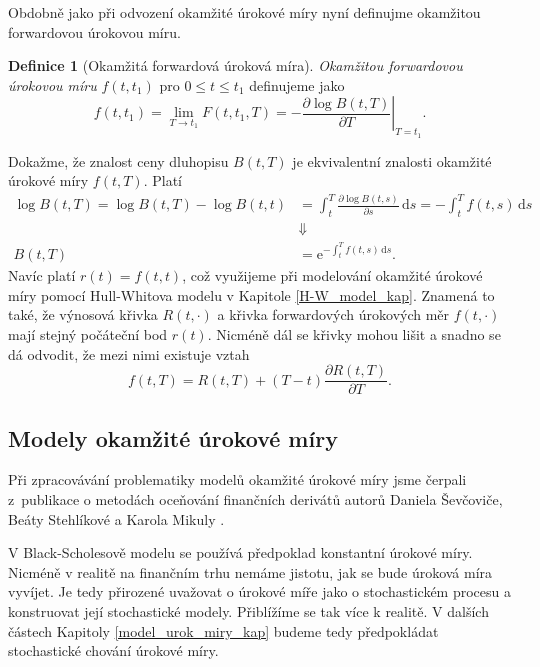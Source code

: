 \documentclass[a4paper,12pt]{report}
\theoremstyle{definition} \newtheorem{definice}[veta]{Definice}
\theoremstyle{remark}
\begin{document}
Obdobně jako při odvození okamžité úrokové míry nyní definujme okamžitou forwardovou úrokovou míru. 
\begin{definice}[Okamžitá forwardová úroková míra]
\textit{Okamžitou forwardovou úrokovou míru} $f(t,t_1)$ pro $0\leq t\leq t_1$ definujeme jako
\begin{equation}\label{okamzik_forward_rov}
f(t,t_1)=\lim_{T\to t_1}F(t,t_1,T)=\left.-\frac{\partial\log B(t,T)}{\partial T}\right|_{T=t_1}.%
\end{equation} 
\end{definice}
Dokažme, že znalost ceny dluhopisu $B(t,T)$ je ekvivalentní znalosti okamžité úrokové míry $f(t,T)$.
Platí
\begin{align*}
\log B(t,T)=\log B(t,T)-\log B(t,t)
&=\int_{t}^T \frac{\partial\log B(t,s)}{\partial s}\,\mathrm{d}s=-\int_{t}^Tf(t,s)\,\mathrm{d}s\\
&\Downarrow\\
B(t,T)&=\mathrm{e}^{-\int_{t}^T f(t,s)\,\mathrm{d}s}.
\end{align*}
Navíc platí $r(t)=f(t,t)$, což využijeme při modelování okamžité úrokové míry pomocí Hull-Whitova modelu v Kapitole \ref{H-W_model_kap}.
Znamená to také, že výnosová křivka $R(t,\cdot)$ a křivka forwardových úrokových měr $f(t,\cdot)$ mají stejný počáteční bod $r(t)$.
Nicméně dál se křivky mohou lišit a snadno se dá odvodit, že mezi nimi existuje vztah
\begin{equation}
f(t,T)=R(t,T)+(T-t)\frac{\partial R(t,T)}{\partial T}.
\end{equation} 

\subsection{Modely okamžité úrokové míry}
Při zpracovávání problematiky modelů okamžité úrokové míry jsme čerpali z~publikace o metodách oceňování finančních derivátů autorů Daniela Ševčoviče, Beáty Stehlíkové a Karola Mikuly \cite{sevcovic2009}. 

V Black-Scholesově modelu se používá předpoklad konstantní úrokové míry.
Nicméně v realitě na finančním trhu nemáme jistotu, jak se bude úroková míra vyvíjet.
Je tedy přirozené uvažovat o úrokové míře jako o stochastickém procesu a konstruovat její stochastické modely.
Přiblížíme se tak více k realitě.
V dalších částech Kapitoly \ref{model_urok_miry_kap} budeme tedy předpokládat stochastické chování úrokové míry.
\end{document}
